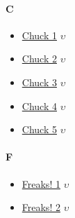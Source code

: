 	\paragraph{C} \hypertarget{SC}{}
		\begin{itemize}
		
			\item \href{https://mega.nz/#F!Kh9FxAQK!pD2jrMc68v74nn1GOAlyHQ} {Chuck 1}  $\upsilon$ \\ 
			\item \href{https://mega.nz/#F!G0UVTIjI!VWThIcVFPxgDs4QsCuz1YQ} {Chuck 2}  $\upsilon$ \\ 
			\item \href{https://mega.nz/#F!f18zRRaZ!fbuWufJlz7v_b_dNNHvy3g} {Chuck 3}  $\upsilon$ \\ 
			\item \href{https://mega.nz/#F!7w9gyLZS!fn1cONK5pPiRyoL4QM_V0Q} {Chuck 4}  $\upsilon$ \\ 
			\item \href{https://mega.nz/#F!6pUl2YYS!XnsxO1R7cwd9STcQ-Qd88Q} {Chuck 5}  $\upsilon$ \\ 
				
		\end{itemize}	
		
		
	\paragraph{F} \hypertarget{SF}{}
		\begin{itemize}
		
			\item \href{https://mega.nz/#F!SgMDxTqD!-rcCNZ134N3q2B08GGQNBA} {Freaks! 1}  $\upsilon$ \\ 
			\item \href{https://mega.nz/#F!791T2RzT!XO0vg9cAeXNqUwWdy87qwg} {Freaks! 2}  $\upsilon$ \\ 
		
		
		\end{itemize}
	
